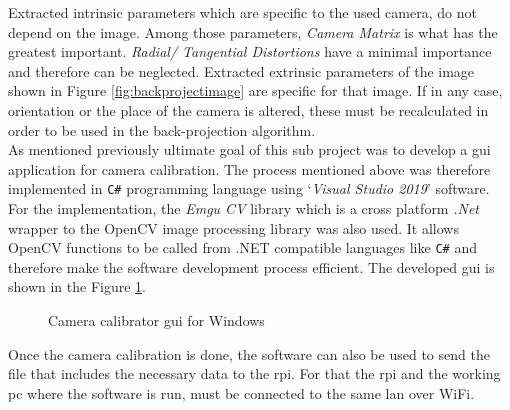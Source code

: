 \documentclass[a4paper,12pt]{report}%
\begin{document}
Extracted intrinsic parameters which are specific to the  used  camera, do not depend on the image. Among those parameters, \textit{Camera Matrix} is what has the greatest important. \textit{Radial/ Tangential Distortions} have a minimal importance and therefore can be neglected. Extracted extrinsic parameters of the image shown in Figure \ref{fig:backprojectimage}  are specific for that image. If in any case, orientation or the place of the camera is altered, these must be recalculated in order to be used in the back-projection algorithm.\\
	
	
	

As mentioned previously ultimate goal of this sub project was to develop a \ac{gui} application for camera calibration. The process mentioned above was therefore implemented in {\tt C\#} programming language using `\textit{Visual Studio 2019}' software. For the implementation, the \textit{Emgu CV} library which is a cross platform \textit{.Net} wrapper to the OpenCV image processing library was also used. It allows OpenCV functions to be called from .NET compatible languages like {\tt C\#} and therefore make the software development process efficient. The developed \ac{gui} is shown in the Figure \ref{fig:calibgui}.

\begin{figure}[H]
	\centering
	\caption{Camera calibrator \ac{gui} for Windows}
	\label{fig:calibgui}
\end{figure}

Once the camera calibration is done, the software can also be used to send the file that includes the necessary data to the \ac{rpi}. For that the \ac{rpi} and the working \ac{pc} where the software is run,  must be connected to the same \ac{lan} over WiFi.
\end{document}
